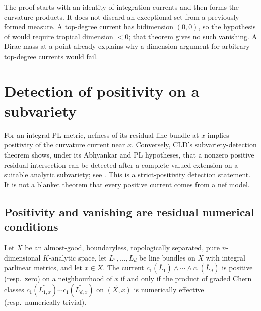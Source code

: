 \begin{remark}
\label{rem:ch17-projection-exceptional-set}
The proof starts with an identity of integration currents and then
forms the curvature products.  It does not discard an exceptional set
from a previously formed measure.  A top-degree current has
bidimension $(0,0)$, so the hypothesis of
 would require tropical dimension
$<0$; that theorem gives no such vanishing.  A Dirac mass at a
point already explains why a dimension argument for arbitrary
top-degree currents would fail.
\end{remark}

\section{Detection of positivity on a subvariety}
\label{sec:ch17-positivity-detection}

For an integral PL metric, nefness of its residual line bundle at $x$
implies positivity of the curvature current near $x$.  Conversely, CLD's
subvariety-detection theorem shows, under its Abhyankar and PL hypotheses,
that a nonzero positive residual intersection can be detected after a
complete valued extension on a suitable analytic subvariety; see
\cite[\S18.9]{CLD25}.  This is a strict-positivity detection statement.  It
is not a blanket theorem that every positive current comes from a nef model.

\subsection{Positivity and vanishing are residual numerical conditions}
\label{sec:ch17-formal-positivity}

\begin{theorem}
\label{thm:ch17-formal-positivity}
Let $X$ be an almost-good, boundaryless, topologically separated, pure
$n$-dimensional $K$-analytic space, let
$\overline L_1,\dots,\overline L_d$ be line bundles on $X$ with integral
parlinear metrics, and let $x\in X$.  The current
$c_1(\overline L_1)\wedge\cdots\wedge c_1(\overline L_d)$ is positive
(resp.\ zero) on a neighbourhood of $x$ if and only if the product of
graded Chern classes
$c_1(\widetilde{L_{1,x}})\cdots c_1(\widetilde{L_{d,x}})$ on
$\widetilde{(X,x)}$ is numerically effective (resp.\ numerically trivial).
\end{theorem}

